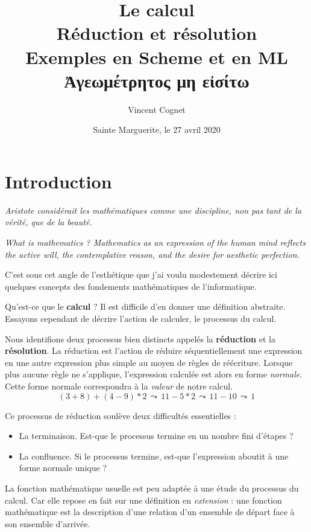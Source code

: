 \documentclass[11pt]{book}
\title{Le calcul \\
     Réduction et résolution \\
	 Exemples en Scheme et en ML \\ \vspace{1cm}
   \textgreek{Ἀγεωμέτρητος μη  εἰσίτω } \\
      }
\author{Vincent Cognet}
\date{Sainte Marguerite, le 27 avril 2020}
\begin{document}
\maketitle
\tableofcontents

\chapter*{Introduction}

\textit{Aristote considérait les mathématiques comme une discipline, non pas tant de la vérité, que de la beauté.}
\cite{ab}


\textit{What is mathematics ? Mathematics as an expression of the human mind reflects
the active will, the contemplative reason, and the desire for aesthetic perfection.} \cite{wm}


C'est sous cet angle de l'esthétique que j'ai voulu modestement décrire ici quelques concepts 
 des fondements mathématiques de l'informatique.

 \vspace{0.5cm}

Qu'est-ce que le \textbf{calcul} ? Il est difficile d'en donner une définition abstraite. Essayons cependant de 
décrire l'action de calculer, le processus du calcul. 

Nous identifions deux processus bien distincts appelés la \textbf{réduction} et la \textbf{résolution}.
La réduction est l'action de réduire séquentiellement une expression en une autre expression plus simple
au moyen de règles de réécriture. Lorsque plus aucune règle ne s'applique, l'expression calculée est alors en forme
\textit{normale}. Cette forme normale correspondra à la \textit{valeur} de notre calcul.
$$(3+8)+(4-9)*2 \,\leadsto\,  11 -5*2 \, \leadsto\, 11 -10 \,\leadsto\, 1 $$

Ce processus de réduction soulève deux difficultés essentielles : 
\begin{itemize}
	\item La terminaison. Est-que le processus termine en un nombre fini d'étapes ?
	\item La confluence. Si le processus termine, est-que l'expression aboutit à une forme normale unique ?
\end{itemize}
\vspace{0.3cm}
La fonction mathématique usuelle est peu adaptée à une étude du processus du calcul. Car elle
repose en fait sur une définition en \textit{extension} : une fonction mathématique est la 
description d'une relation d'un ensemble de départ face à son ensemble d'arrivée.
\end{document}
